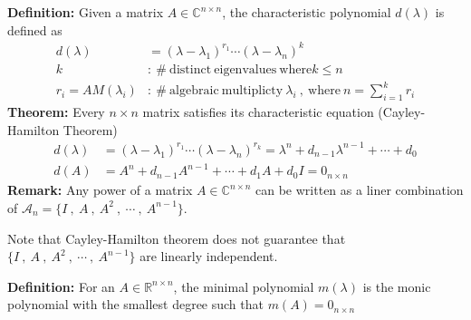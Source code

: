 \documentclass[twoside]{article}
\begin{document}
\textbf{Definition:} Given a matrix $A \in \mathbb{C}^{n \times n}$, the characteristic polynomial $d(\lambda)$ is defined as 
%
\begin{align*}
d(\lambda) &= (\lambda - \lambda_1)^{r_1} \cdots (\lambda - \lambda_n)^{k} 
\\
k &: \ \# \ \mathrm{distinct} \ \mathrm{eigenvalues}  \ \mathrm{where} k \leq n
\\
r_i = AM(\lambda_i) &: \ \# \ \mathrm{algebraic} \ \mathrm{multiplicty}  \ \lambda_i \ , \ \mathrm{where} \ n = \sum_{i=1}^k r_i
\end{align*}
% 
\textbf{Theorem:} Every $n \times n$ matrix satisfies its characteristic equation (Cayley-Hamilton Theorem)
%
\begin{align*}
d(\lambda) &= (\lambda - \lambda_1)^{r_1} \cdots (\lambda - \lambda_n)^{r_k} = \lambda^n + d_{n-1} \lambda^{n-1} + \cdots + d_0
\\
d(A) &= A^n + d_{n-1} A^{n-1} + \cdots + d_1 A + d_0 I = 0_{n \times n} 
\end{align*}
%
\textbf{Remark:} Any power of a matrix $A \in \mathbb{C}^{n \times n}$ can be written as a liner combination of 
$\mathcal{A}_n = \lbrace I \ , \ A \ , \ A^2 \ , \ \cdots \ , \ A^{n-1} \rbrace$.

Note that Cayley-Hamilton theorem does not guarantee that $\lbrace I \ , \ A \ , \ A^2 \ , \ \cdots \ , \ A^{n-1} \rbrace$ are linearly independent. 

\textbf{Definition:} For an $A \in \mathbb{R}^{n \times n}$, the minimal polynomial $m(\lambda)$ is the monic polynomial with the smallest degree such that 
$m(A) = 0_{n\times n}$
\end{document}
